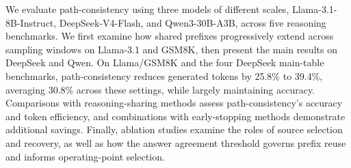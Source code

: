 We evaluate path-consistency using three models of different scales, Llama-3.1-8B-Instruct, DeepSeek-V4-Flash, and Qwen3-30B-A3B, across five reasoning benchmarks. We first examine how shared prefixes progressively extend across sampling windows on Llama-3.1 and GSM8K, then present the main results on DeepSeek and Qwen. On Llama/GSM8K and the four DeepSeek main-table benchmarks, path-consistency reduces generated tokens by 25.8\% to 39.4\%, averaging 30.8\% across these settings, while largely maintaining accuracy. Comparisons with reasoning-sharing methods assess path-consistency's accuracy and token efficiency, and combinations with early-stopping methods demonstrate additional savings. Finally, ablation studies examine the roles of source selection and recovery, as well as how the answer agreement threshold governs prefix reuse and informs operating-point selection.
